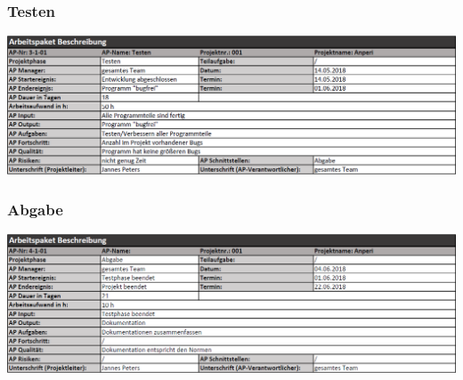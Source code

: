 \documentclass{scrartcl}
\begin{document}
\subsubsection{Testen}
\includegraphics[scale=0.6]{AP3-1-01.png}
\subsubsection{Abgabe}
\includegraphics[scale=0.6]{AP4-1-01.png}
\end{document}
